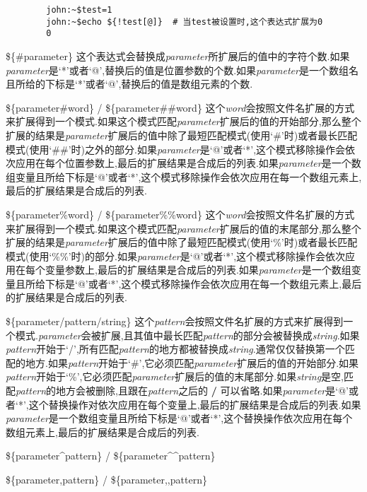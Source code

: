 \documentclass[draft,openany]{book}
\begin{document}
\begin{CJK}{UTF8}{gbsn}
\begin{basedescript}{\desclabelstyle{\nextlinelabel}\desclabelwidth{2.5em}}
\begin{verbatim}
        john:~$test=1
        john:~$echo ${!test[@]}  # 当test被设置时,这个表达式扩展为0
        0
        \end{verbatim}
    \item[\$\{\#parameter\}]
        这个表达式会替换成\emph{parameter}所扩展后的值中的字符个数.如果\emph{parameter}是`*'或者`@',替换后的值是位置参数的个数.如果\emph{parameter}是一个数组名且所给的下标是`*'或者`@',替换后的值是数组元素的个数.
    \item[\$\{parameter\#word\} / \$\{parameter\#\#word\}]
        这个\emph{word}会按照文件名扩展的方式来扩展得到一个模式.如果这个模式匹配\emph{parameter}扩展后的值的开始部分,那么整个扩展的结果是\emph{parameter}扩展后的值中除了最短匹配模式(使用`\#'时)或者最长匹配模式(使用`\#\#'时)之外的部分.如果\emph{parameter}是`@'或者`*',这个模式移除操作会依次应用在每个位置参数上,最后的扩展结果是合成后的列表.如果\emph{parameter}是一个数组变量且所给下标是`@'或者`*',这个模式移除操作会依次应用在每一个数组元素上,最后的扩展结果是合成后的列表.
    \item[\$\{parameter\%word\} / \$\{parameter\%\%word\}]
        这个\emph{word}会按照文件名扩展的方式来扩展得到一个模式.如果这个模式匹配\emph{parameter}扩展后的值的末尾部分,那么整个扩展的结果是\emph{parameter}扩展后的值中除了最短匹配模式(使用`\%'时)或者最长匹配模式(使用`\%\%'时)的部分.如果\emph{parameter}是`@'或者`*',这个模式移除操作会依次应用在每个变量参数上,最后的扩展结果是合成后的列表.如果\emph{parameter}是一个数组变量且所给下标是`@'或者`*',这个模式移除操作会依次应用在每一个数组元素上,最后的扩展结果是合成后的列表.
    \item[\$\{parameter/pattern/string\}]
        这个\emph{pattern}会按照文件名扩展的方式来扩展得到一个模式.\emph{parameter}会被扩展,且其值中最长匹配\emph{pattern}的部分会被替换成\emph{string}.如果\emph{pattern}开始于`/',所有匹配\emph{pattern}的地方都被替换成\emph{string}.通常仅仅替换第一个匹配的地方.如果\emph{pattern}开始于`\#',它必须匹配\emph{parameter}扩展后的值的开始部分.如果\emph{pattern}开始于`\%',它必须匹配\emph{parameter}扩展后的值的末尾部分.如果\emph{string}是空,匹配\emph{pattern}的地方会被删除,且跟在\emph{pattern}之后的 \textbf{/} 可以省略.如果\emph{parameter}是`@'或者`*',这个替换操作对依次应用在每个变量上,最后的扩展结果是合成后的列表.如果\emph{parameter}是一个数组变量且所给下标是`@'或者`*',这个替换操作依次应用在每个数组元素上,最后的扩展结果是合成后的列表.
    \item[\$\{parameter\^{}pattern\} / \$\{parameter\^{}\^{}pattern\}]
    \item[\$\{parameter,pattern\} / \$\{parameter,,pattern\}]

\end{basedescript}
\end{CJK}
\end{document}
